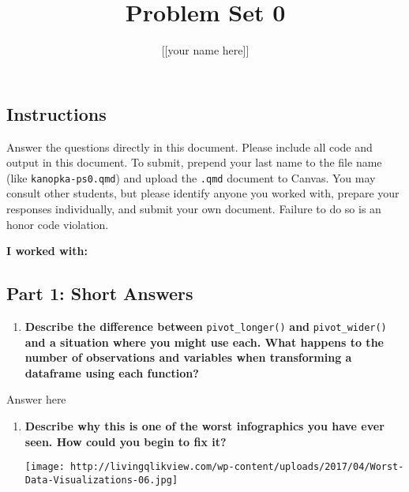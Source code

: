 \documentclass[
  letterpaper,
  DIV=11,
  numbers=noendperiod]{scrartcl}
\title{Problem Set 0}
\author{{[}{[}your name here{]}{]}}
\date{}
\providecommand{\tightlist}{%
  \setlength{\itemsep}{0pt}\setlength{\parskip}{0pt}}\usepackage{longtable,booktabs,array}
\begin{document}
\maketitle
\ifdefined\Shaded\renewenvironment{Shaded}{\begin{tcolorbox}[sharp corners, interior hidden, borderline west={3pt}{0pt}{shadecolor}, frame hidden, enhanced, breakable, boxrule=0pt]}{\end{tcolorbox}}\fi

\hypertarget{instructions}{%
\subsection{Instructions}\label{instructions}}

Answer the questions directly in this document. Please include all code
and output in this document. To submit, prepend your last name to the
file name (like \texttt{kanopka-ps0.qmd}) and upload the \texttt{.qmd}
document to Canvas. You may consult other students, but please identify
anyone you worked with, prepare your responses individually, and submit
your own document. Failure to do so is an honor code violation.

\textbf{I worked with:}

\hypertarget{part-1-short-answers}{%
\subsection{Part 1: Short Answers}\label{part-1-short-answers}}

\begin{enumerate}
\def\labelenumi{\arabic{enumi}.}
\tightlist
\item
  \textbf{Describe the difference between} \texttt{pivot\_longer()}
  \textbf{and} \texttt{pivot\_wider()} \textbf{and a situation where you
  might use each. What happens to the number of observations and
  variables when transforming a dataframe using each function?}
\end{enumerate}

Answer here

\begin{enumerate}
\def\labelenumi{\arabic{enumi}.}
\setcounter{enumi}{1}
\item
  \textbf{Describe why this is one of the worst infographics you have
  ever seen. How could you begin to fix it?}

  \texttt{[image: http://livingqlikview.com/wp-content/uploads/2017/04/Worst-Data-Visualizations-06.jpg]}
\end{enumerate}
\end{document}
